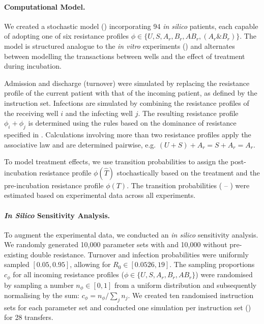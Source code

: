 \paragraph{Computational Model.}
We created a stochastic model () incorporating 94 \textit{in silico} patients, each capable of adopting one of six resistance profiles $\phi \in \{U, S, A_r, B_r, AB_r, (A_r\&B_r)\}$. 
The model is structured analogue to the \textit{in vitro} experiments () and alternates between modelling the transactions between wells and the effect of treatment during incubation. 

Admission and discharge (turnover) were simulated by replacing the resistance profile of the current patient with that of the incoming patient, as defined by the instruction set.
Infections are simulated by combining the resistance profiles of the receiving well $i$ and the infecting well $j$. 
The resulting resistance profile $\phi_i + \phi_j$ is determined using the rules based on the dominance of resistance specified in . 
Calculations involving more than two resistance profiles apply the associative law and are determined pairwise, e.g. $(U + S) + A_r = S + A_r = A_r$. 

To model treatment effects, we use transition probabilities to assign the post-incubation resistance profile $\phi(\hat{T})$ stochastically based on the treatment and the pre-incubation resistance profile $\phi(T)$. 
The transition probabilities ( -- ) were estimated based on experimental data across all experiments.   


\paragraph{\textit{In Silico} Sensitivity Analysis.}
To augment the experimental data, we conducted an \textit{in silico} sensitivity analysis.
We randomly generated 10,000 parameter sets with and 10,000 without pre-existing double resistance.
Turnover and infection probabilities were uniformly sampled $[0.05, 0.95]$, allowing for  $R_0 \in [0.0526, 19]$. 
The sampling proportions $c_\phi$ for all incoming resistance profiles ($\phi \in \{U, S, A_r, B_r, AB_r\}$) were randomised by sampling a number $n_\phi \in [0, 1]$ from a uniform distribution and subsequently normalising by the sum: $c_\phi = {n_\phi}/{\sum_j n_j}$. 
We created ten randomised instruction sets for each parameter set and conducted one simulation per instruction set () for 28 transfers. 

